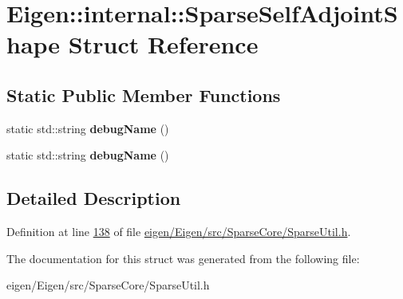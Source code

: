 \hypertarget{struct_eigen_1_1internal_1_1_sparse_self_adjoint_shape}{}\section{Eigen\+:\+:internal\+:\+:Sparse\+Self\+Adjoint\+Shape Struct Reference}
\label{struct_eigen_1_1internal_1_1_sparse_self_adjoint_shape}
\subsection*{Static Public Member Functions}
\begin{DoxyCompactItemize}
\item 
\mbox{\label{struct_eigen_1_1internal_1_1_sparse_self_adjoint_shape_a7216e466563d54a23ab198ea235513bd}} 
static std\+::string {\bfseries debug\+Name} ()
\item 
\mbox{\label{struct_eigen_1_1internal_1_1_sparse_self_adjoint_shape_a7216e466563d54a23ab198ea235513bd}} 
static std\+::string {\bfseries debug\+Name} ()
\end{DoxyCompactItemize}


\subsection{Detailed Description}


Definition at line \hyperlink{eigen_2_eigen_2src_2_sparse_core_2_sparse_util_8h_source_l00138}{138} of file \hyperlink{eigen_2_eigen_2src_2_sparse_core_2_sparse_util_8h_source}{eigen/\+Eigen/src/\+Sparse\+Core/\+Sparse\+Util.\+h}.



The documentation for this struct was generated from the following file\+:\begin{DoxyCompactItemize}
\item 
eigen/\+Eigen/src/\+Sparse\+Core/\+Sparse\+Util.\+h\end{DoxyCompactItemize}
